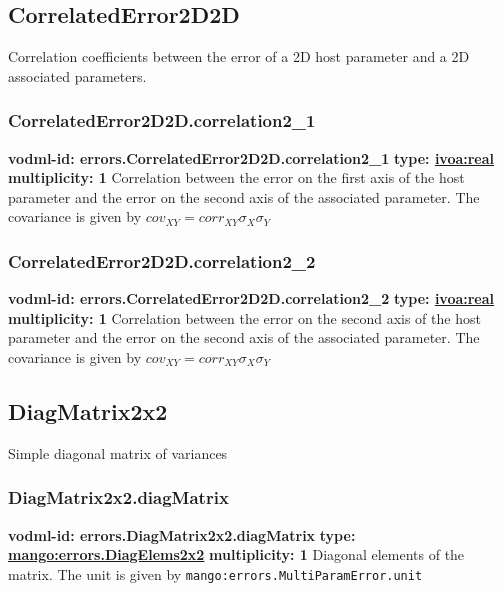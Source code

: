   \subsection{CorrelatedError2D2D}
  \label{sect:errors.CorrelatedError2D2D}
    Correlation coefficients between the error of a 2D host parameter and a 2D associated parameters.

    \subsubsection{CorrelatedError2D2D.correlation2\_1}
      \textbf{vodml-id: errors.CorrelatedError2D2D.correlation2\_1} \newline
      \textbf{type: \hyperref[sect:ivoa]{ivoa:real}} \newline
      \textbf{multiplicity: 1} \newline 
      Correlation between the error on the first axis of the host parameter and the error on the second axis of the associated parameter. The covariance is given by $cov_{XY}=corr_{XY}\sigma_{X}\sigma_{Y}$

    \subsubsection{CorrelatedError2D2D.correlation2\_2}
      \textbf{vodml-id: errors.CorrelatedError2D2D.correlation2\_2} \newline
      \textbf{type: \hyperref[sect:ivoa]{ivoa:real}} \newline
      \textbf{multiplicity: 1} \newline 
      Correlation between the error on the second axis of the host parameter and the error on the second axis of the associated parameter. The covariance is given by $cov_{XY}=corr_{XY}\sigma_{X}\sigma_{Y}$

  \subsection{DiagMatrix2x2}
  \label{sect:errors.DiagMatrix2x2}
    Simple diagonal matrix of variances

    \subsubsection{DiagMatrix2x2.diagMatrix}
      \textbf{vodml-id: errors.DiagMatrix2x2.diagMatrix} \newline
      \textbf{type: \hyperref[sect:errors.DiagElems2x2]{mango:errors.DiagElems2x2}} \newline
      \textbf{multiplicity: 1} \newline 
      Diagonal elements of the matrix. The unit is given by \texttt{mango:errors.MultiParamError.unit}

